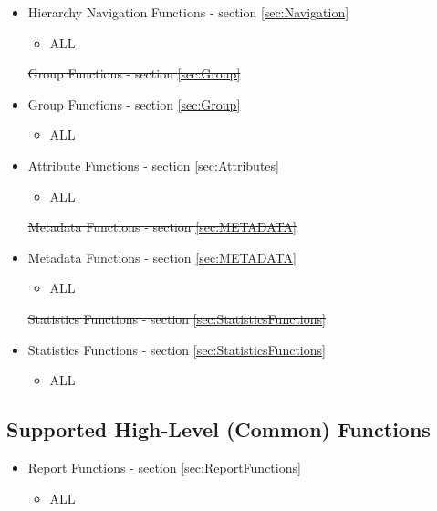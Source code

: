 \documentclass[12pt]{report} %
\providecommand{\DIFdeltex}[1]{{\protect\color{red}\sout{#1}}}                      %
\providecommand{\DIFaddbegin}{} %
\providecommand{\DIFaddend}{} %
\providecommand{\DIFdelbegin}{} %
\providecommand{\DIFdelend}{} %
\providecommand{\DIFdel}[1]{\texorpdfstring{\DIFdeltex{#1}}{}} %
\newcommand{\DIFscaledelfig}{0.5}
\newlength{\DIFdelgraphicswidth} %
\newlength{\DIFdelgraphicsheight} %
\newcommand{\DIFaddincludegraphics}[2][]{{\color{blue}\fbox{\DIFOincludegraphics[#1]{#2}}}} %
\newcommand{\DIFdelincludegraphics}[2][]{%
\sbox{\DIFdelgraphicsbox}{\DIFOincludegraphics[#1]{#2}}%
\settoboxwidth{\DIFdelgraphicswidth}{\DIFdelgraphicsbox} %
\settoboxtotalheight{\DIFdelgraphicsheight}{\DIFdelgraphicsbox} %
\scalebox{\DIFscaledelfig}{%
\parbox[b]{\DIFdelgraphicswidth}{\usebox{\DIFdelgraphicsbox}\\[-\baselineskip] \rule{\DIFdelgraphicswidth}{0em}}\llap{\resizebox{\DIFdelgraphicswidth}{\DIFdelgraphicsheight}{%
\setlength{\unitlength}{\DIFdelgraphicswidth}%
\begin{picture}(1,1)%
\thicklines\linethickness{2pt} %
{\color[rgb]{1,0,0}\put(0,0){\framebox(1,1){}}}%
{\color[rgb]{1,0,0}\put(0,0){\line( 1,1){1}}}%
{\color[rgb]{1,0,0}\put(0,1){\line(1,-1){1}}}%
\end{picture}%
}\hspace*{3pt}}} %
} %
\DeclareRobustCommand{\DIFaddbegin}{\DIFOaddbegin \let\includegraphics\DIFaddincludegraphics} %
\DeclareRobustCommand{\DIFaddend}{\DIFOaddend \let\includegraphics\DIFOincludegraphics} %
\DeclareRobustCommand{\DIFdelbegin}{\DIFOdelbegin \let\includegraphics\DIFdelincludegraphics} %
\DeclareRobustCommand{\DIFdelend}{\DIFOaddend \let\includegraphics\DIFOincludegraphics} %
\begin{document}
\begin{itemize}[noitemsep,nolistsep] 
	\item{Hierarchy Navigation Functions - section \ref{sec:Navigation}}
		\begin{itemize}[noitemsep,nolistsep] 
			\item{ALL}
		\end{itemize}
	\DIFdelbegin %
\DIFdel{Group Functions - section \ref{sec:Group}
	}\DIFdelend \DIFaddbegin \item{Group Functions - section \ref{sec:Group}}
		\DIFaddend \begin{itemize}[noitemsep,nolistsep] 
			\item{ALL}
		\end{itemize}
	\item{Attribute Functions - section \ref{sec:Attributes}}
		\begin{itemize}[noitemsep,nolistsep] 
			\item{ALL}
		\end{itemize}
	\DIFdelbegin %
\DIFdel{Metadata Functions - section \ref{sec:METADATA}
	}\DIFdelend \DIFaddbegin \item{Metadata Functions - section \ref{sec:METADATA}}
		\DIFaddend \begin{itemize}[noitemsep,nolistsep] 
			\item{ALL}
		\end{itemize}
	\DIFdelbegin %
\DIFdel{Statistics Functions - section \ref{sec:StatisticsFunctions}
	}\DIFdelend \DIFaddbegin \item{Statistics Functions - section \ref{sec:StatisticsFunctions}}
		\DIFaddend \begin{itemize}[noitemsep,nolistsep] 
			\item{ALL}
		\end{itemize}
\end{itemize}


\subsection{Supported High-Level (Common) Functions}\label{sec:AdminMCHighLevel}

\begin{itemize}[noitemsep,nolistsep] 
	\DIFdelbegin %
\DIFdel{- section \ref{sec:ReportFunctions}
}\DIFdelend \DIFaddbegin \item{Report Functions - section \ref{sec:ReportFunctions}}
	\DIFaddend \begin{itemize}[noitemsep,nolistsep] 
		\item{ALL}
	\end{itemize}
\end{itemize}
\end{document}
